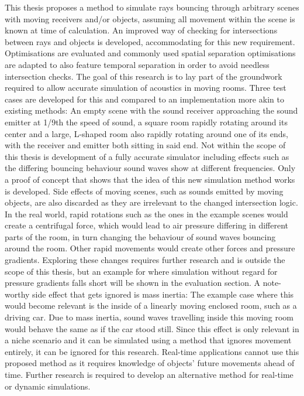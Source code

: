This thesis proposes a method to simulate rays bouncing through arbitrary scenes with moving receivers and/or objects,
assuming all movement within the scene is known at time of calculation.
An improved way of checking for intersections between rays and objects is developed, accommodating for this new requirement.
\newline
Optimisations are evaluated and commonly used spatial separation optimisations are adapted to also feature temporal separation
in order to avoid needless intersection checks.
\newline
The goal of this research is to lay part of the groundwork required to allow accurate simulation of acoustics in moving rooms.
\newline
Three test cases are developed for this and compared to an implementation more akin to existing methods:
An empty scene with the sound receiver approaching the sound emitter at 1/9th the speed of sound,
a square room rapidly rotating around its center
and a large, L-shaped room also rapidly rotating around one of its ends, with the receiver and emitter both sitting in said end.
\newline
Not within the scope of this thesis is development of a fully accurate simulator
including effects such as the differing bouncing behaviour sound waves show at different frequencies.
Only a proof of concept that shows that the idea of this new simulation method works is developed.
\newline
Side effects of moving scenes, such as sounds emitted by moving objects, are also discarded as they are irrelevant to
the changed intersection logic.
\newline
In the real world, rapid rotations such as the ones in the example scenes would create a centrifugal force,
which would lead to air pressure differing in different parts of the room,
in turn changing the behaviour of sound waves bouncing around the room.
Other rapid movements would create other forces and pressure gradients.
Exploring these changes requires further research and is outside the scope of this thesis,
but an example for where simulation without regard for pressure gradients falls short will be shown in the evaluation section.
\newline
A note-worthy side effect that gets ignored is mass inertia:
The example case where this would become relevant is the inside of a linearly moving enclosed room, such as a driving car.
Due to mass inertia, sound waves travelling inside this moving room would behave the same as if the car stood still.
Since this effect is only relevant in a niche scenario and it can be simulated using a method that ignores movement entirely,
it can be ignored for this research.
\newline
Real-time applications cannot use this proposed method as it requires knowledge of objects' future movements ahead of time.
Further research is required to develop an alternative method for real-time or dynamic simulations.


